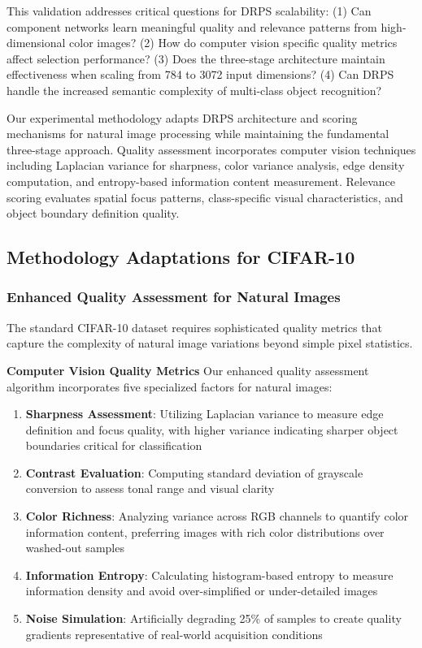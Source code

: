 \documentclass[12pt]{article}
\begin{document}
This validation addresses critical questions for DRPS scalability: (1) Can component networks learn meaningful quality and relevance patterns from high-dimensional color images? (2) How do computer vision specific quality metrics affect selection performance? (3) Does the three-stage architecture maintain effectiveness when scaling from 784 to 3072 input dimensions? (4) Can DRPS handle the increased semantic complexity of multi-class object recognition?

Our experimental methodology adapts DRPS architecture and scoring mechanisms for natural image processing while maintaining the fundamental three-stage approach. Quality assessment incorporates computer vision techniques including Laplacian variance for sharpness, color variance analysis, edge density computation, and entropy-based information content measurement. Relevance scoring evaluates spatial focus patterns, class-specific visual characteristics, and object boundary definition quality.

\subsection{Methodology Adaptations for CIFAR-10}\label{methodology}

\subsubsection{Enhanced Quality Assessment for Natural Images}\label{quality-assessment}

The standard CIFAR-10 dataset requires sophisticated quality metrics that capture the complexity of natural image variations beyond simple pixel statistics.

\textbf{Computer Vision Quality Metrics}
Our enhanced quality assessment algorithm incorporates five specialized factors for natural images:

\begin{enumerate}
\item \textbf{Sharpness Assessment}: Utilizing Laplacian variance to measure edge definition and focus quality, with higher variance indicating sharper object boundaries critical for classification
\item \textbf{Contrast Evaluation}: Computing standard deviation of grayscale conversion to assess tonal range and visual clarity
\item \textbf{Color Richness}: Analyzing variance across RGB channels to quantify color information content, preferring images with rich color distributions over washed-out samples
\item \textbf{Information Entropy}: Calculating histogram-based entropy to measure information density and avoid over-simplified or under-detailed images
\item \textbf{Noise Simulation}: Artificially degrading 25\% of samples to create quality gradients representative of real-world acquisition conditions
\end{enumerate}
\end{document}
